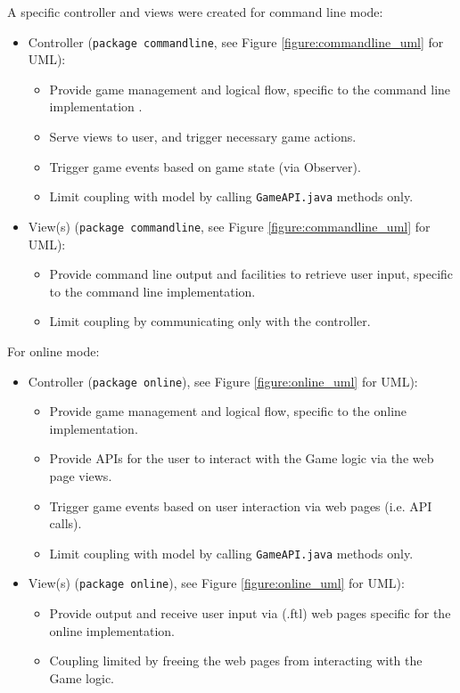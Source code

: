 A specific controller and views were created for command line mode:

\begin{itemize}
	\item Controller (\texttt{package commandline}, see Figure \ref{figure:commandline_uml} for UML):
	\begin{itemize}
		\item Provide game management and logical flow, specific to the command line implementation .
		\item Serve views to user, and trigger necessary game actions.
		\item Trigger game events based on game state (via Observer).
		\item Limit coupling with model by calling \texttt{GameAPI.java} methods only.
	\end{itemize}

	\item View(s) (\texttt{package commandline}, see Figure \ref{figure:commandline_uml} for UML):
	\begin{itemize}
		\item Provide command line output and facilities to retrieve user input, specific to the command line implementation.
		\item Limit coupling by communicating only with the controller.
	\end{itemize}
\end{itemize}

For online mode:

\begin{itemize}
	\item Controller (\texttt{package online}), see Figure \ref{figure:online_uml} for UML):
	\begin{itemize}
		\item Provide game management and logical flow, specific to the online implementation.
		\item Provide APIs for the user to interact with the Game logic via the web page views.
		\item Trigger game events based on user interaction via web pages (i.e. API calls).
		\item Limit coupling with model by calling \texttt{GameAPI.java} methods only.
	\end{itemize}

	\item View(s) (\texttt{package online}), see Figure \ref{figure:online_uml} for UML):
	\begin{itemize}
		\item Provide output and receive user input via (.ftl) web pages specific for the online implementation.
		\item Coupling limited by freeing the web pages from interacting with the Game logic.
	\end{itemize}
\end{itemize}

